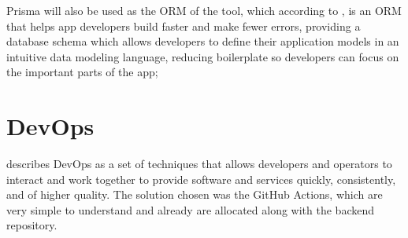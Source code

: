 \begin{description}
    Prisma will also be used as the \ac{ORM} of the tool, which according to \textcite{prisma}, is an \ac{ORM} that helps app developers build faster and make fewer errors, providing a database schema which allows developers to define their application models in an intuitive data modeling language, reducing boilerplate so developers can focus on the important parts of the app;
    
    
\end{description}

\section{\ac{DevOps}}\label{sec:dev-ops}

\textcite{perera2017improve} describes \ac{DevOps} as a set of techniques that allows developers and operators to interact and work together to provide software and services quickly, consistently, and of higher quality. The solution chosen was the GitHub Actions, which are very simple to understand and already are allocated along with the backend repository.



